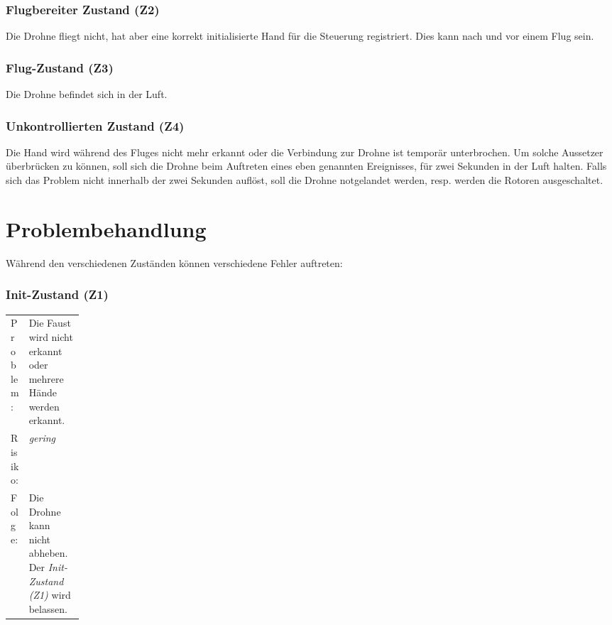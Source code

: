 \subsubsection{Flugbereiter Zustand (Z2)}
Die Drohne fliegt nicht, hat aber eine korrekt initialisierte Hand für die Steuerung registriert. Dies kann nach und vor einem Flug sein.

\subsubsection{Flug-Zustand (Z3)}
Die Drohne befindet sich in der Luft.

\subsubsection{Unkontrollierten Zustand (Z4)}
Die Hand wird während des Fluges nicht mehr erkannt oder die Verbindung zur Drohne ist temporär unterbrochen.
Um solche Aussetzer überbrücken zu können, soll sich die Drohne beim Auftreten eines eben genannten Ereignisses, für zwei Sekunden in der Luft halten.
Falls sich das Problem nicht innerhalb der zwei Sekunden auflöst, soll die Drohne notgelandet werden, resp. werden die Rotoren ausgeschaltet.


\section{Problembehandlung}
Während den verschiedenen Zuständen können verschiedene Fehler auftreten:

\subsubsection{Init-Zustand (Z1)}

\begin{table}[H]
	\centering
	\small\renewcommand{\arraystretch}{1.4}
	\begin{tabularx}{0.9\textwidth}{ L{0.121\linewidth} | X  }%
		\hline
		Problem: & Die Faust wird nicht erkannt oder mehrere Hände werden erkannt.\\
		Risiko: & \textit{gering}\\
		Folge: & Die Drohne kann nicht abheben. Der \textit{Init-Zustand (Z1)} wird belassen.\\
		\hline
	\end{tabularx}
\end{table}



